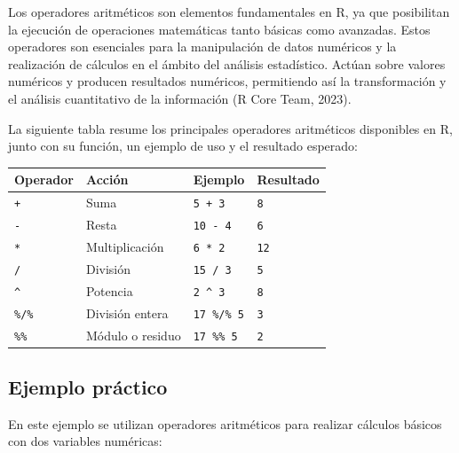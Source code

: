 \documentclass[
  spanish,
  a4paper,
  DIV=11,
  numbers=noendperiod,
  onepage,
  openany]{scrreprt}
\begin{document}
Los operadores aritméticos son elementos fundamentales en R, ya que
posibilitan la ejecución de operaciones matemáticas tanto básicas como
avanzadas. Estos operadores son esenciales para la manipulación de datos
numéricos y la realización de cálculos en el ámbito del análisis
estadístico. Actúan sobre valores numéricos y producen resultados
numéricos, permitiendo así la transformación y el análisis cuantitativo
de la información (R Core Team, 2023).

La siguiente tabla resume los principales operadores aritméticos
disponibles en R, junto con su función, un ejemplo de uso y el resultado
esperado:

\begin{longtable}[]{@{}llll@{}}
\toprule\noalign{}
\textbf{Operador} & \textbf{Acción} & \textbf{Ejemplo} &
\textbf{Resultado} \\
\midrule\noalign{}
\endhead
\bottomrule\noalign{}
\endlastfoot
\texttt{+} & Suma & \texttt{5\ +\ 3} & \texttt{8} \\
\texttt{-} & Resta & \texttt{10\ -\ 4} & \texttt{6} \\
\texttt{*} & Multiplicación & \texttt{6\ *\ 2} & \texttt{12} \\
\texttt{/} & División & \texttt{15\ /\ 3} & \texttt{5} \\
\texttt{\^{}} & Potencia & \texttt{2\ \^{}\ 3} & \texttt{8} \\
\texttt{\%/\%} & División entera & \texttt{17\ \%/\%\ 5} & \texttt{3} \\
\texttt{\%\%} & Módulo o residuo & \texttt{17\ \%\%\ 5} & \texttt{2} \\
\end{longtable}

\subsection{Ejemplo práctico}\label{ejemplo-pruxe1ctico}

En este ejemplo se utilizan operadores aritméticos para realizar
cálculos básicos con dos variables numéricas:
\end{document}
